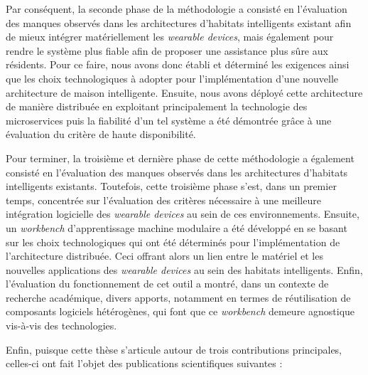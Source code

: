 {{Par conséquent, la seconde phase de la méthodologie a consisté en l'évaluation des manques observés dans les architectures d'habitats intelligents existant afin de mieux intégrer matériellement les \textit{wearable devices}, mais également pour rendre le système plus fiable afin de proposer une assistance plus sûre aux résidents. Pour ce faire, nous avons donc établi et déterminé les exigences ainsi que les choix technologiques à adopter pour l'implémentation d'une nouvelle architecture de maison intelligente. Ensuite, nous avons déployé cette architecture de manière distribuée en exploitant principalement la technologie des microservices puis la fiabilité d'un tel système a été démontrée grâce à une évaluation du critère de haute disponibilité.

Pour terminer, la troisième et dernière phase de cette méthodologie a également consisté en l'évaluation des manques observés dans les architectures d'habitats intelligents existants. Toutefois, cette troisième phase s'est, dans un premier temps, concentrée sur l'évaluation des critères nécessaire à une meilleure intégration logicielle des \textit{wearable devices} au sein de ces environnements. Ensuite, un \textit{workbench} d'apprentissage machine modulaire a été développé en se basant sur les choix technologiques qui ont été déterminés pour l'implémentation de l'architecture distribuée. Ceci offrant alors un lien entre le matériel et les nouvelles applications des \textit{wearable devices} au sein des habitats intelligents. Enfin, l'évaluation du fonctionnement de cet outil a montré, dans un contexte de recherche académique, divers apports, notamment en termes de réutilisation de composants logiciels hétérogènes, qui font que ce \textit{workbench} demeure agnostique vis-à-vis des technologies.

Enfin, puisque cette thèse s'articule autour de trois contributions principales, celles-ci ont fait l'objet des publications scientifiques suivantes :

}}

